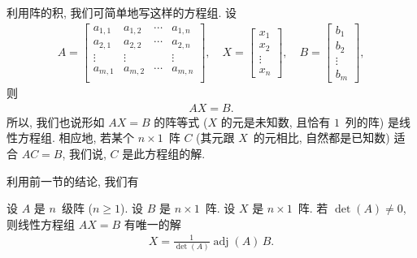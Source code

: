 \documentclass[%
    UTF8,%
    fontset=none,%
    punct=kaiming,%
    zihao=-4,%
    a4paper,%
    oneside,%
]{ctexbook}
\renewcommand*{\geq}{\geqslant}
\begin{document}
利用阵的积, 我们可简单地写这样的方程组.
设
\begin{align*}
    A =
    \begin{bmatrix}
        a_{1,1} & a_{1,2} & \cdots & a_{1,n} \\
        a_{2,1} & a_{2,2} & \cdots & a_{2,n} \\
        \vdots  & \vdots  & {}     & \vdots  \\
        a_{m,1} & a_{m,2} & \cdots & a_{m,n} \\
    \end{bmatrix},
    \quad
    X =
    \begin{bmatrix}
        x_1 \\ x_2 \\ \vdots \\ x_n
    \end{bmatrix},
    \quad
    B =
    \begin{bmatrix}
        b_1 \\ b_2 \\ \vdots \\ b_m
    \end{bmatrix},
\end{align*}
则
\begin{align*}
    AX = B.
\end{align*}
所以, 我们也说形如 \(AX = B\) 的阵等式
(\(X\) 的元是未知数, 且恰有 \(1\)~列的阵)
是线性方程组.
相应地, 若某个 \(n \times 1\)~阵 \(C\)
(其元跟 \(X\)~的元相比, 自然都是已知数)
适合 \(AC = B\),
我们说, \(C\) 是此方程组的解.

利用前一节的结论, 我们有


\begin{theorem}[Cramer 公式, 1]
    设 \(A\) 是 \(n\)~级阵 (\(n \geq 1\)).
    设 \(B\) 是 \(n \times 1\)~阵.
    设 \(X\) 是 \(n \times 1\)~阵.
    若 \(\det {(A)} \neq 0\),
    则线性方程组 \(AX = B\) 有唯一的解
    \begin{align*}
        X = \frac{1}{\det {(A)}} \operatorname{adj} {(A)}\,B.
    \end{align*}
\end{theorem}
\end{document}
